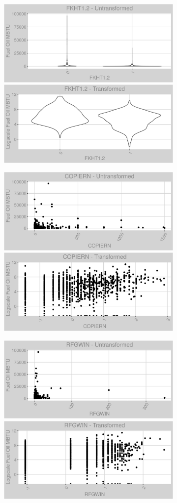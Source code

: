 \FloatBarrier
\newpage
\begin{figure}
\centering
\begin{subfigure}{1\textwidth}
\centering
\includegraphics[width=.49\textwidth, height=0.3\textheight]{Images/fuel_oil_var_original_6.png}
\includegraphics[width=.49\textwidth, height=0.3\textheight]{Images/fuel_oil_var_transformed_6.png}
\end{subfigure}
\begin{subfigure}{1\textwidth}
\centering
\includegraphics[width=.49\textwidth, height=0.3\textheight]{Images/fuel_oil_var_original_7.png}
\includegraphics[width=.49\textwidth, height=0.3\textheight]{Images/fuel_oil_var_transformed_7.png}
\end{subfigure}
\begin{subfigure}{1\textwidth}
\centering
\includegraphics[width=.49\textwidth, height=0.3\textheight]{Images/fuel_oil_var_original_8.png}
\includegraphics[width=.49\textwidth, height=0.3\textheight]{Images/fuel_oil_var_transformed_8.png}
\end{subfigure}
\end{figure}

